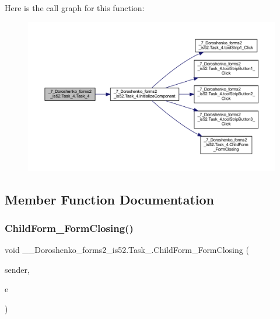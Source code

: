 Here is the call graph for this function\+:
\nopagebreak
\begin{figure}[H]
\begin{center}
\leavevmode
\includegraphics[width=350pt]{class__7___doroshenko__forms2__is52_1_1_task__4_ab407149ae7de6eea3e2107c0c264b49d_cgraph}
\end{center}
\end{figure}


\subsection{Member Function Documentation}
\hypertarget{class__7___doroshenko__forms2__is52_1_1_task__4_a554f04a00a6726075b7d99bd45bc2754}{}\label{class__7___doroshenko__forms2__is52_1_1_task__4_a554f04a00a6726075b7d99bd45bc2754} 
\subsubsection{\texorpdfstring{Child\+Form\+\_\+\+Form\+Closing()}{ChildForm\_FormClosing()}}
{\footnotesize\ttfamily void \+\_\+\_\+\+Doroshenko\+\_\+forms2\+\_\+is52.\+Task\+\_.\+Child\+Form\+\_\+\+Form\+Closing (\begin{DoxyParamCaption}\item[{object}]{sender,  }\item[{Form\+Closing\+Event\+Args}]{e }\end{DoxyParamCaption})\hspace{0.3cm}{\ttfamily [private]}}

